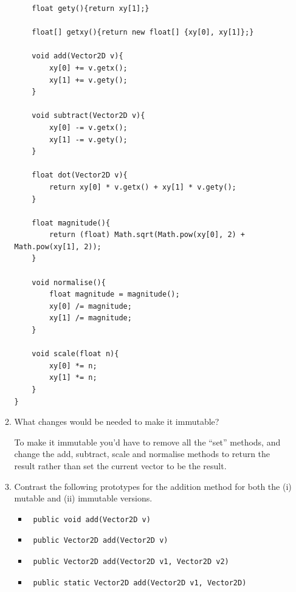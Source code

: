 \documentclass[10pt,\jkfside,a4paper]{article}
\begin{document}
\begin{enumerate}
\begin{enumerate}[label=(\alph*)]
\begin{verbatim}
    float gety(){return xy[1];}

    float[] getxy(){return new float[] {xy[0], xy[1]};}

    void add(Vector2D v){
        xy[0] += v.getx();
        xy[1] += v.gety();
    }

    void subtract(Vector2D v){
        xy[0] -= v.getx();
        xy[1] -= v.gety();
    }

    float dot(Vector2D v){
        return xy[0] * v.getx() + xy[1] * v.gety();
    }

    float magnitude(){
        return (float) Math.sqrt(Math.pow(xy[0], 2) + Math.pow(xy[1], 2));
    }

    void normalise(){
        float magnitude = magnitude();
        xy[0] /= magnitude;
        xy[1] /= magnitude;
    }

    void scale(float n){
        xy[0] *= n;
        xy[1] *= n;
    }
}
\end{verbatim}

\item What changes would be needed to make it immutable?

To make it immutable you'd have to remove all the ``set'' methods, 
and change the add, subtract, scale and normalise methods to return the 
result rather 
than set the current vector to be the result.

\item Contrast the following prototypes for the addition method for both the (i) 
mutable and (ii) immutable versions.

\begin{itemize}
\item \begin{verbatim} public void add(Vector2D v)\end{verbatim}
\item \begin{verbatim} public Vector2D add(Vector2D v)\end{verbatim}
\item \begin{verbatim} public Vector2D add(Vector2D v1, Vector2D v2)\end{verbatim}
\item \begin{verbatim} public static Vector2D add(Vector2D v1, Vector2D)\end{verbatim}
\end{itemize}

\begin{enumerate}[label=(\roman*)]


\end{enumerate}
\end{enumerate}
\end{enumerate}
\end{document}
